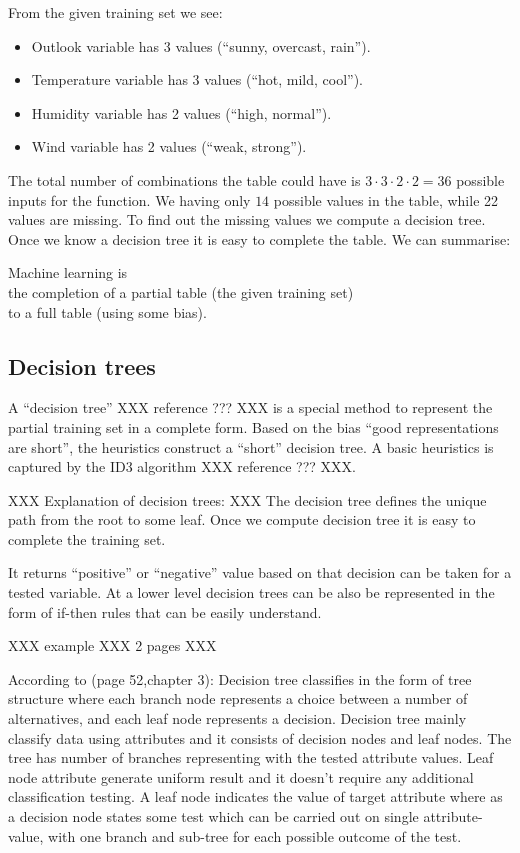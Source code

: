 \documentclass{report}
\begin{document}
From the given training set we see:
\begin{itemize}
\item Outlook variable has 3 values (``sunny, overcast, rain'').
\item Temperature variable has 3 values (``hot, mild, cool'').
\item Humidity variable has 2 values (``high, normal'').
\item Wind variable has 2 values (``weak, strong'').
\end{itemize}
The total number of combinations the table could have is $3 \cdot 3 \cdot 2 \cdot 2 = 36$ possible inputs for the function. We having only $14$ possible values in the table, while 22 values are missing. To find out the missing values we compute a decision tree. Once we know a decision tree it is easy to complete the table. We can summarise:
\begin{center}
  Machine learning is\\
  the completion of a partial table (the given training set)\\
  to a full table (using some bias).
\end{center}





\subsection{Decision trees}
\label{sec:dectree}

A ``decision tree'' XXX reference ??? XXX is a special method to represent the partial training set in a complete form. Based on the bias ``good representations are short'', the heuristics construct a ``short'' decision tree. A basic heuristics is captured by the ID3 algorithm XXX reference ??? XXX.

XXX Explanation of decision trees: XXX  The decision tree defines the unique path from the root to some leaf. Once we compute decision tree it is easy to complete the training set. 

It returns ``positive'' or ``negative'' value based on that decision can be taken for a tested variable. At a lower level decision trees can be also be represented in the form of if-then rules that can be easily understand.

XXX example XXX 2 pages XXX

According to \cite{Mitchell1997MachineLearning}(page 52,chapter 3): Decision tree classifies in the form of tree structure where each branch node represents a choice between a number of alternatives, and each leaf node represents a decision. Decision tree mainly classify data using attributes and it consists of decision nodes and leaf nodes. The tree has number of branches representing with the tested attribute values. Leaf node attribute generate uniform result and it doesn't require any additional classification testing. A leaf node indicates the value of target attribute where as a decision node states some test which can be carried out on single attribute-value, with one branch and sub-tree for each possible outcome of the test.
\end{document}
